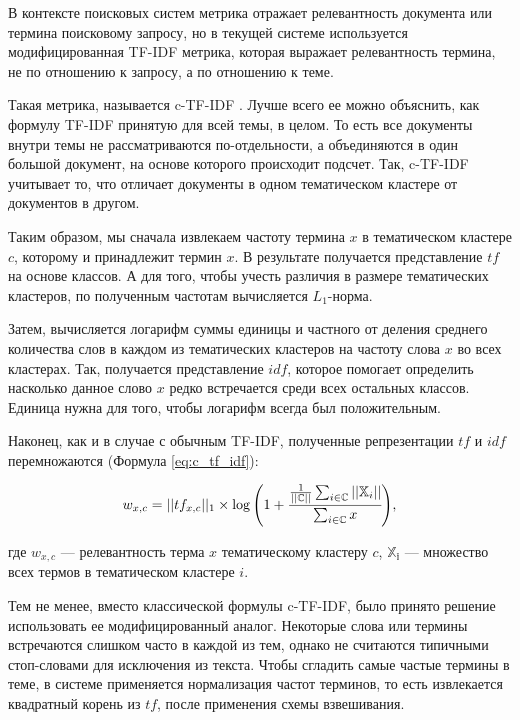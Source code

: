 В контексте поисковых систем метрика отражает релевантность документа или термина поисковому запросу,
но в текущей системе используется модифицированная TF-IDF метрика, которая выражает релевантность
термина, не по отношению к запросу, а по отношению к теме.

Такая метрика, называется c-TF-IDF \parencite{BERTopic2022}. Лучше всего ее можно объяснить, как формулу TF-IDF принятую для всей
темы, в целом. То есть все документы внутри темы не рассматриваются по-отдельности, а объединяются в один
большой документ, на основе которого происходит подсчет. Так, c-TF-IDF учитывает то, что отличает документы
в одном тематическом кластере от документов в другом.

Таким образом, мы сначала извлекаем частоту термина $x$ в тематическом кластере $c$, которому и принадлежит
термин $x$. В результате получается представление $tf$ на основе классов. А для того, чтобы учесть различия
в размере тематических кластеров, по полученным частотам вычисляется $L_1$-норма.

Затем, вычисляется логарифм суммы единицы и частного от деления среднего количества слов в каждом
из тематических кластеров на частоту слова $x$ во всех кластерах. Так, получается представление $idf$,
которое помогает определить насколько данное слово $x$ редко встречается среди всех остальных классов.
Единица нужна для того, чтобы логарифм всегда был положительным.

Наконец, как и в случае с обычным TF-IDF, полученные репрезентации $tf$ и $idf$ перемножаются
(Формула \ref{eq:c_tf_idf}):

\begin{equation}\label{eq:c_tf_idf}
    w_{x, c} =
    ||tf_{x, c}||_1
    \times
    \log\Bigg(
        1 + \cfrac{
            \frac{1}{||\mathbb{C}||}\sum_{i \in \mathbb{C}}||\mathbb{X}_i||
        }{
            \sum_{i \in \mathbb{C}}x
        }
    \Bigg),
\end{equation}

где $w_{x, c}$ --- релевантность терма $x$ тематическому кластеру $c$,
$\mathbb{X_i}$ --- множество всех термов в тематическом кластере $i$.

Тем не менее, вместо классической формулы c-TF-IDF, было принято решение использовать
ее модифицированный аналог. Некоторые слова или термины встречаются слишком часто
в каждой из тем, однако не считаются типичными стоп-словами для исключения из текста.
Чтобы сгладить самые частые термины в теме, в системе применяется нормализация частот
терминов, то есть извлекается квадратный корень из $tf$, после применения схемы взвешивания.


